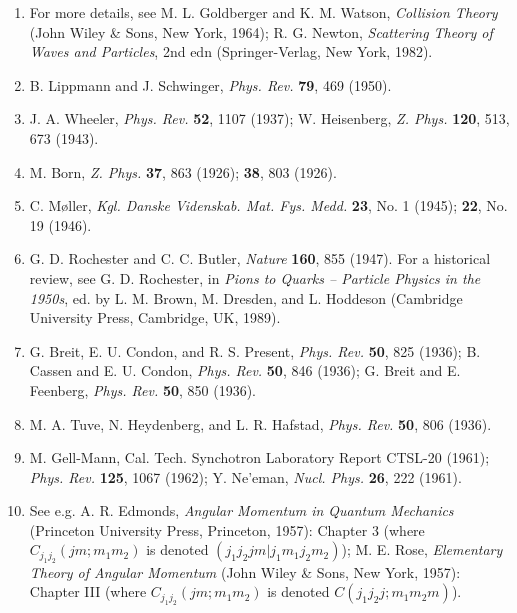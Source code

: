 
\begin{enumerate}
\item \label{ref:3.1}For more details, see M. L. Goldberger and K. M. Watson,
  \emph{Collision Theory} (John Wiley \& Sons, New York, 1964); R. G. Newton,
  \emph{Scattering Theory of Waves and Particles}, 2nd edn
  (Springer-Verlag, New York, 1982).

\item[1a.] \label{ref:3.1a}B. Lippmann and J. Schwinger, \emph{Phys. Rev.} \textbf{79}, 469
  (1950).

\item[2.] \label{ref:3.2}J. A. Wheeler, \emph{Phys. Rev.} \textbf{52}, 1107 (1937);
  W. Heisenberg, \emph{Z. Phys.} \textbf{120}, 513, 673 (1943).

\item[3.] \label{ref:3.3}M. Born, \emph{Z. Phys.} \textbf{37}, 863 (1926); \textbf{38}, 803
  (1926).

\item[4.] \label{ref:3.4}C. M\o ller, \emph{Kgl. Danske Videnskab. Mat. Fys. Medd.}
  \textbf{23}, No. 1 (1945); \textbf{22}, No. 19 (1946).

\item[5.] \label{ref:3.5}G. D. Rochester and C. C. Butler, \emph{Nature} \textbf{160}, 855
  (1947). For a historical review, see G. D. Rochester, in \emph{Pions to
  Quarks -- Particle Physics in the 1950s}, ed. by L. M. Brown, M. Dresden,
  and L. Hoddeson (Cambridge University Press, Cambridge, UK, 1989).

\item[6.] \label{ref:3.6}G. Breit, E. U. Condon, and R. S. Present, \emph{Phys. Rev.}
  \textbf{50}, 825 (1936); B. Cassen and E. U. Condon, \emph{Phys. Rev.}
  \textbf{50}, 846 (1936); G. Breit and E. Feenberg, \emph{Phys. Rev.}
  \textbf{50}, 850 (1936).

\item[7.] \label{ref:3.7}M. A. Tuve, N. Heydenberg, and L. R. Hafstad, \emph{Phys. Rev.}
  \textbf{50}, 806 (1936).

\item[8.] \label{ref:3.8}M. Gell-Mann, Cal. Tech. Synchotron Laboratory Report CTSL-20
  (1961); \emph{Phys. Rev.} \textbf{125}, 1067 (1962); Y. Ne'eman,
  \emph{Nucl. Phys.} \textbf{26}, 222 (1961).

\item[9.] \label{ref:3.9}See e.g. A. R. Edmonds, \emph{Angular Momentum in Quantum
  Mechanics} (Princeton University Press, Princeton, 1957): Chapter 3 (where
  $C_{j_1j_2}(jm;m_1m_2)$ is denoted
  $(j_1j_2jm|j_1m_1j_2m_2)$); M. E. Rose, \emph{Elementary Theory of Angular
  Momentum} (John Wiley \& Sons, New York, 1957): Chapter III (where
  $C_{j_1j_2}(jm;m_1m_2)$ is denoted $C(j_1j_2j;m_1m_2m)$).


\end{enumerate}
